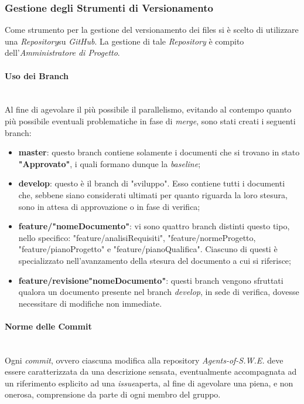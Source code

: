 \subsubsection{Gestione degli Strumenti di Versionamento}\label{ProcessiOrganizzativi_Procedure_GestioneStrumentiVersionamento}
	Come strumento per la gestione del versionamento dei files si è scelto di utilizzare una \textit{Repository}\glossario su \textit{GitHub}\glossario. La gestione di tale \textit{Repository} è compito dell'\textit{Amministratore di Progetto}.

\paragraph{Uso dei Branch} ~\\
	Al fine di agevolare il più possibile il parallelismo, evitando al contempo quanto più possibile eventuali problematiche in fase di \textit{merge}\glossario, sono stati creati i seguenti branch\glossario:
	\begin{itemize}
	\item \textbf{master}: questo branch contiene solamente i documenti che si trovano in stato \textbf{"Approvato"}, i quali formano dunque la \textit{baseline}\glossario;
	\item \textbf{develop}: questo è il branch di "sviluppo". Esso contiene tutti i documenti che, sebbene siano considerati ultimati per quanto riguarda la loro stesura, sono in attesa di approvazione o in fase di verifica;
	\item \textbf{feature/"nomeDocumento"}: vi sono quattro branch distinti questo tipo, nello specifico: "feature/analisiRequisiti", "feature/normeProgetto, "feature/pianoProgetto" e "feature/pianoQualifica". Ciascuno di questi è specializzato nell'avanzamento della stesura del documento a cui si riferisce;
	\item \textbf{feature/revisione"nomeDocumento"}: questi branch vengono sfruttati qualora un documento presente nel branch \textit{develop}, in sede di verifica, dovesse necessitare di modifiche non immediate.
	\end{itemize}

\paragraph{Norme delle Commit} ~\\
	Ogni \textit{commit}\glossario, ovvero ciascuna modifica alla repository \textit{Agents-of-S.W.E.} deve essere caratterizzata da una descrizione sensata, eventualmente accompagnata ad un riferimento esplicito ad una \textit{issue}\glossario aperta, al fine di agevolare una piena, e non onerosa, comprensione da parte di ogni membro del gruppo.

